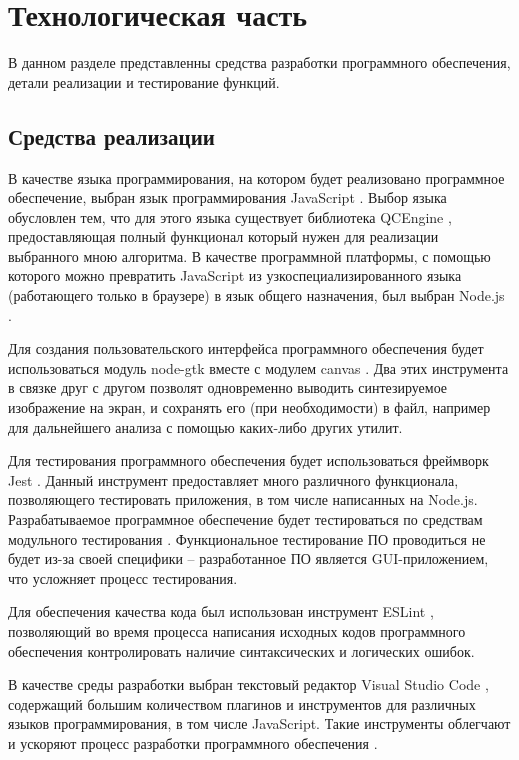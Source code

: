 \chapter{Технологическая часть}

В данном разделе представленны средства разработки программного обеспечения, детали реализации и тестирование функций.

\section{Средства реализации}

В качестве языка программирования, на котором будет реализовано программное обеспечение, выбран язык программирования JavaScript \cite{js}. Выбор языка обусловлен тем, что для этого языка существует библиотека QCEngine \cite{qcengine}, предоставляющая полный функционал который нужен для реализации выбранного мною алгоритма. В качестве программной платформы, с помощью которого можно превратить JavaScript из узкоспециализированного языка (работающего только в браузере) в язык общего назначения, был выбран Node.js \cite{nodejs}.

Для создания пользовательского интерфейса программного обеспечения будет использоваться модуль node-gtk \cite{node-gtk} вместе с модулем canvas \cite{node-canvas}. Два этих инструмента в связке друг с другом позволят одновременно выводить синтезируемое изображение на экран, и сохранять его (при необходимости) в файл, например для дальнейшего анализа с помощью каких-либо других утилит.

Для тестирования программного обеспечения будет использоваться фреймворк Jest \cite{jest}. Данный инструмент предоставляет много различного функционала, позволяющего тестировать приложения, в том числе написанных на Node.js. Разрабатываемое программное обеспечение будет тестироваться по средствам модульного тестирования \cite{utests}. Функциональное тестирование \cite{ftests} ПО проводиться не будет из-за своей специфики -- разработанное ПО является GUI-приложением, что усложняет процесс тестирования.

Для обеспечения качества кода был использован инструмент ESLint \cite{eslint}, позволяющий во время процесса написания исходных кодов программного обеспечения контролировать наличие синтаксических и логических ошибок.

В качестве среды разработки выбран текстовый редактор Visual Studio Code \cite{vscode}, содержащий большим количеством плагинов и инструментов для различных языков программирования, в том числе JavaScript. Такие инструменты облегчают и ускоряют процесс разработки программного обеспечения \cite{why-ide}.

